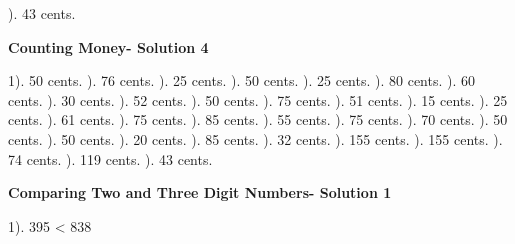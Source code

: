 \documentclass{article}%
\begin{document}
). 43 cents.%
\newline%
\newpage%
\large%
\begin{center}%
\textbf{Counting Money- Solution 4}%
\newline%
\end{center} \normalsize%
1). 50 cents.%
). 76 cents.%
). 25 cents.%
). 50 cents.%
). 25 cents.%
). 80 cents.%
). 60 cents.%
). 30 cents.%
). 52 cents.%
). 50 cents.%
). 75 cents.%
). 51 cents.%
). 15 cents.%
). 25 cents.%
). 61 cents.%
). 75 cents.%
). 85 cents.%
). 55 cents.%
). 75 cents.%
). 70 cents.%
). 50 cents.%
). 50 cents.%
). 20 cents.%
). 85 cents.%
). 32 cents.%
). 155 cents.%
). 155 cents.%
). 74 cents.%
). 119 cents.%
). 43 cents.%
\newline%
\newpage%
\large%
\begin{center}%
\textbf{Comparing Two and Three Digit Numbers- Solution 1}%
\newline%
\end{center} \normalsize%
1). 395 < 838%
\newline%
\end{document}
